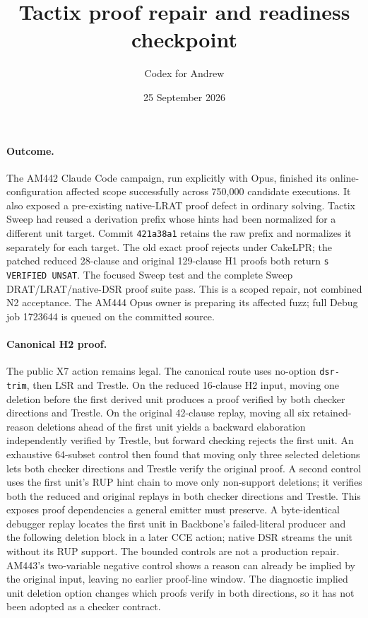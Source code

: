 \documentclass[11pt]{article}
\title{Tactix proof repair and readiness checkpoint}
\author{Codex for Andrew}
\date{25 September 2026}
\begin{document}
\maketitle

\paragraph{Outcome.}
The AM442 Claude Code campaign, run explicitly with Opus, finished its
online-configuration affected scope successfully across 750,000 candidate
executions. It also exposed a pre-existing native-LRAT proof defect in ordinary
solving. Tactix Sweep had reused a derivation prefix whose hints had been
normalized for a different unit target. Commit \texttt{421a38a1} retains the
raw prefix and normalizes it separately for each target. The old exact proof
rejects under CakeLPR; the patched reduced 28-clause and original 129-clause
H1 proofs both return \texttt{s VERIFIED UNSAT}. The focused Sweep test and
the complete Sweep DRAT/LRAT/native-DSR proof suite pass. This is a scoped
repair, not combined N2 acceptance. The AM444 Opus owner is preparing its
affected fuzz; full Debug job 1723644 is queued on the committed source.

\paragraph{Canonical H2 proof.}
The public X7 action remains legal. The canonical route uses no-option
\texttt{dsr-trim}, then LSR and Trestle. On the
reduced 16-clause H2 input, moving one deletion before the first derived unit
produces a proof verified by both checker directions and Trestle. On the
original 42-clause replay, moving all six retained-reason deletions ahead of
the first unit yields a backward elaboration independently verified by
Trestle, but forward checking rejects the first unit. An exhaustive
64-subset control then found that moving only three selected deletions lets
both checker directions and Trestle verify the original proof. A second
control uses the first unit's RUP hint chain to move only non-support
deletions; it verifies both the reduced and original replays in both checker
directions and Trestle. This exposes proof dependencies a general emitter
must preserve. A byte-identical debugger replay locates the first unit in
Backbone's failed-literal producer and the following deletion block in a
later CCE action; native DSR streams the unit without its RUP support. The
bounded controls are not a production repair. AM443's
two-variable negative control shows a reason can already be implied by the
original input, leaving no earlier proof-line window. The diagnostic implied
unit deletion option changes which proofs verify in both directions, so it
has not been adopted as a checker contract.
\end{document}
